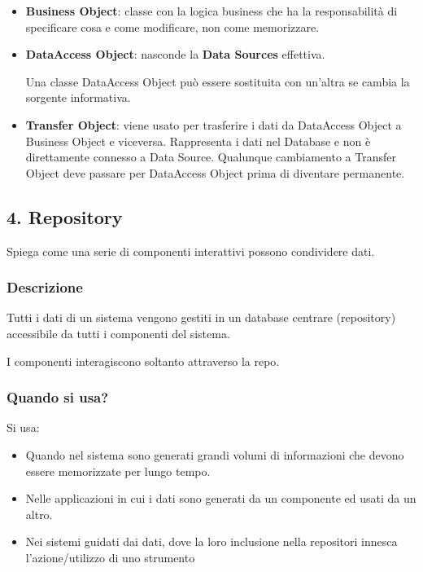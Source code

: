 \documentclass{report}
\begin{document}
\begin{itemize}
    \item \textbf{Business Object}: classe con la logica business che ha la responsabilità di specificare cosa e come modificare, non come memorizzare.
    \item \textbf{DataAccess Object}: nasconde la \textbf{Data Sources} effettiva.

    \noindent
    Una classe DataAccess Object può essere sostituita con un'altra se cambia la sorgente informativa.

    \item \textbf{Transfer Object}: viene usato per trasferire i dati da DataAccess Object a Business Object e viceversa. Rappresenta i dati nel Database e non è direttamente connesso a Data Source. Qualunque cambiamento a Transfer Object deve passare per DataAccess Object prima di diventare permanente.
\end{itemize}

\newpage
\subsection*{4. Repository}
Spiega come una serie di componenti interattivi possono condividere dati.

\subsubsection*{Descrizione}
Tutti i dati di un sistema vengono gestiti in un database centrare (repository) accessibile da tutti i componenti del sistema.

\noindent
I componenti interagiscono soltanto attraverso la repo.

\subsubsection*{Quando si usa?}
Si usa:
\begin{itemize}
    \item Quando nel sistema sono generati grandi volumi di informazioni che devono essere memorizzate per lungo tempo.
    \item Nelle applicazioni in cui i dati sono generati da un componente ed usati da un altro.
    \item Nei sistemi guidati dai dati, dove la loro inclusione nella repositori innesca l'azione/utilizzo di uno strumento
\end{itemize}
\end{document}
